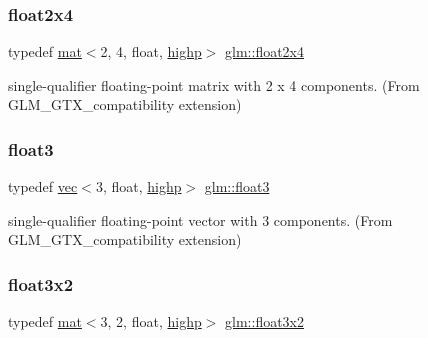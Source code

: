 \subsubsection{\texorpdfstring{float2x4}{float2x4}}
{\footnotesize\ttfamily typedef \hyperlink{structglm_1_1mat}{mat}$<$2, 4, float, \hyperlink{namespaceglm_a36ed105b07c7746804d7fdc7cc90ff25ac6f7eab42eacbb10d59a58e95e362074}{highp}$>$ \hyperlink{group__gtx__compatibility_gadd10766e2393a0e0eaf91ae4d2e85f35}{glm\+::float2x4}}



single-\/qualifier floating-\/point matrix with 2 x 4 components. (From G\+L\+M\+\_\+\+G\+T\+X\+\_\+compatibility extension) 

\mbox{\label{group__gtx__compatibility_ga8bbd0db121b50b0904f9a23adb3bbc45}} 
\subsubsection{\texorpdfstring{float3}{float3}}
{\footnotesize\ttfamily typedef \hyperlink{structglm_1_1vec}{vec}$<$3, float, \hyperlink{namespaceglm_a36ed105b07c7746804d7fdc7cc90ff25ac6f7eab42eacbb10d59a58e95e362074}{highp}$>$ \hyperlink{group__gtx__compatibility_ga8bbd0db121b50b0904f9a23adb3bbc45}{glm\+::float3}}



single-\/qualifier floating-\/point vector with 3 components. (From G\+L\+M\+\_\+\+G\+T\+X\+\_\+compatibility extension) 

\mbox{\label{group__gtx__compatibility_ga8e7b0c3f63f470d7a7913453194b0c99}} 
\subsubsection{\texorpdfstring{float3x2}{float3x2}}
{\footnotesize\ttfamily typedef \hyperlink{structglm_1_1mat}{mat}$<$3, 2, float, \hyperlink{namespaceglm_a36ed105b07c7746804d7fdc7cc90ff25ac6f7eab42eacbb10d59a58e95e362074}{highp}$>$ \hyperlink{group__gtx__compatibility_ga8e7b0c3f63f470d7a7913453194b0c99}{glm\+::float3x2}}



